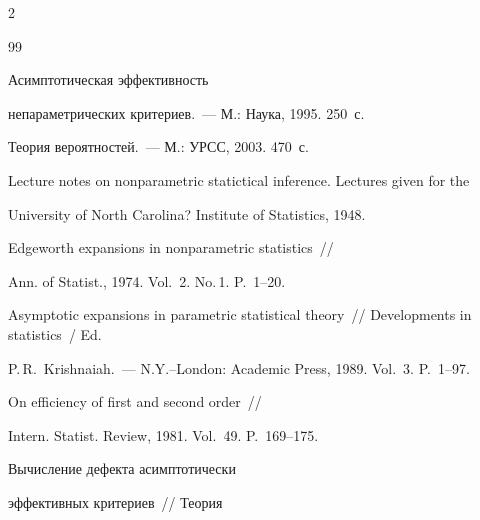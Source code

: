 \begin{multicols}{2}
{{\begin{thebibliography}{99}




Асимптотическая эффективность


непараметрических критериев.~---  М.: Наука, 1995. 250~с.









Теория вероятностей.~--- М.: УРСС, 2003. 470~с.









Lecture notes on nonparametric statictical inference. Lectures given for the


University of North Carolina? Institute of Statistics, 1948.









 Edgeworth expansions in nonparametric statistics~//


  Ann. of Statist., 1974. Vol.~2. No.\,1. P.~1--20.


  






  Asymptotic expansions in parametric statistical theory~// Developments in statistics~/ Ed.\


  P.\,R.~Krishnaiah.~--- N.Y.--London: Academic Press, 1989. Vol.~3. P.~1--97.


  






 On efficiency of first and second order~//


Intern. Statist. Review, 1981. Vol.~49. P.~169--175.









Вычисление дефекта асимптотически


эффективных критериев~// Теория



\end{thebibliography}}}
\end{multicols}
